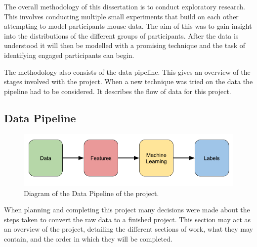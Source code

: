 \documentclass{article}
\begin{document}
The overall methodology of this dissertation is to conduct exploratory research.
This involves conducting multiple small experiments that build on each other attempting to model participants mouse data.
The aim of this was to gain insight into the distributions of the different groups of participants.
After the data is understood it will then be modelled with a promising technique and the task of identifying engaged participants can begin. 

The methodology also consists of the data pipeline.
This gives an overview of the stages involved with the project.
When a new technique was tried on the data the pipeline had to be considered. 
It describes the flow of data for this project.





\subsection{Data Pipeline}

\begin{figure}[ht!]
    \centering
    \includegraphics[scale=0.5]{Images/Data-Pipeline.png}
    \caption{Diagram of the Data Pipeline of the project.}
    \label{fig:test}
\end{figure}

When planning and completing this project many decisions were made about the steps taken to convert the raw data to a finished project.
This section may act as an overview of the project, detailing the different sections of work, what they may contain, and the order in which they will be completed.
\end{document}
